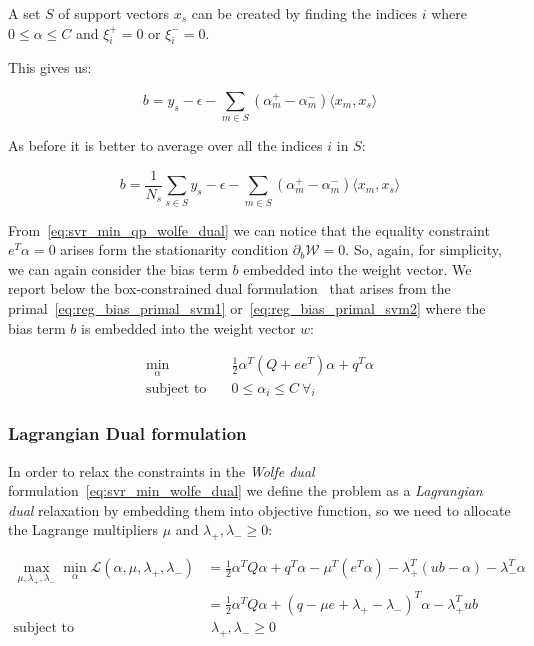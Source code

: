 A set $S$ of support vectors $x_s$ can be created by finding the indices $i$ where $0\leq\alpha\leq C$ and $\xi_i^+=0$ or $\xi_i^-=0$.

This gives us:

\begin{equation} \label{eq:svr_b}
    b=y_s-\epsilon-\sum_{m\in S}(\alpha_m^+ -\alpha_m^-) \langle x_m, x_s \rangle
\end{equation}

As before it is better to average over all the indices $i$ in $S$:

\begin{equation} \label{eq:svr_b_avg}
    b=\frac{1}{N_s}\sum_{s\in S}y_s-\epsilon-\sum_{m \in S}(\alpha_m^+ - \alpha_m^-)\langle x_m, x_s \rangle
\end{equation}

From~\eqref{eq:svr_min_qp_wolfe_dual} we can notice that the equality constraint $e^T \alpha = 0$ arises form the stationarity condition $\partial_{{b}} \mathcal{W}=0$. So, again, for simplicity, we can again consider the bias term $b$ embedded into the weight vector. We report below the box-constrained dual formulation~\cite{hsu2002simple} that arises from the primal~\eqref{eq:reg_bias_primal_svm1} or~\eqref{eq:reg_bias_primal_svm2} where the bias term $b$ is embedded into the weight vector $w$:

\begin{equation} \label{eq:svr_min_bcqp_wolf_dual}
    \begin{aligned}
        \min_{\alpha} \quad & \frac{1}{2} \alpha^T (Q + ee^T)\alpha+q^T\alpha \\
            \text{subject to} \quad & 0\leq\alpha_i\leq C \ \forall_i
    \end{aligned}
\end{equation}

\subsubsection{Lagrangian Dual formulation}

In order to relax the constraints in the \emph{Wolfe dual} formulation~\eqref{eq:svr_min_wolfe_dual} we define the problem as a \emph{Lagrangian dual} relaxation by embedding them into objective function, so we need to allocate the Lagrange multipliers $\mu$ and $\lambda_+, \lambda_- \geq 0$:

\begin{equation} \label{eq:l1_svr_lagrangian_dual}
	\begin{aligned}
		    \max_{\mu,\lambda_+,\lambda_-} \min_{\alpha} \mathcal{L}(\alpha,\mu,\lambda_+,\lambda_-) &= \frac{1}{2} \alpha^T Q\alpha+q^T\alpha - \mu^T (e^T \alpha) - \lambda_+^T (ub - \alpha) - \lambda_-^T \alpha \\
    &= \frac{1}{2} \alpha^T Q\alpha + (q - \mu e + \lambda_+ - \lambda_-)^T \alpha - \lambda_+^T ub \\
    \text{subject to} \quad & \,\, \lambda_+, \lambda_- \geq 0
	\end{aligned}
\end{equation}

